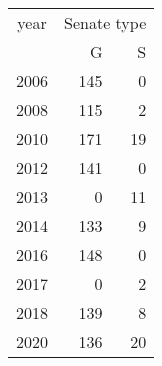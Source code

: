 \footnotesize\begin{tabular}[t]{lrr}
\toprule
\multicolumn{1}{c}{year} & \multicolumn{2}{c}{Senate type} \\
\cmidrule(l{3pt}r{3pt}){1-1} \cmidrule(l{3pt}r{3pt}){2-3}
  & G & S\\
\midrule
2006 & 145 & 0\\
2008 & 115 & 2\\
2010 & 171 & 19\\
2012 & 141 & 0\\
2013 & 0 & 11\\
2014 & 133 & 9\\
2016 & 148 & 0\\
2017 & 0 & 2\\
2018 & 139 & 8\\
2020 & 136 & 20\\
\bottomrule
\end{tabular}
